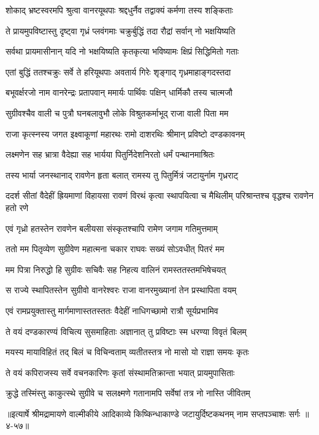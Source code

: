 
\twolineshloka
{शोकाद् भ्रष्टस्वरमपि श्रुत्वा वानरयूथपाः}
{श्रद्दधुर्नैव तद्वाक्यं कर्मणा तस्य शङ्किताः} %

\twolineshloka
{ते प्रायमुपविष्टास्तु दृष्ट्वा गृध्रं प्लवंगमाः}
{चक्रुर्बुद्धिं तदा रौद्रां सर्वान् नो भक्षयिष्यति} %

\twolineshloka
{सर्वथा प्रायमासीनान् यदि नो भक्षयिष्यति}
{कृतकृत्या भविष्यामः क्षिप्रं सिद्धिमितो गताः} %

\twolineshloka
{एतां बुद्धिं ततश्चक्रुः सर्वे ते हरियूथपाः}
{अवतार्य गिरेः शृङ्गाद् गृध्रमाहाङ्गदस्तदा} %

\twolineshloka
{बभूवर्क्षरजो नाम वानरेन्द्रः प्रतापवान्}
{ममार्यः पार्थिवः पक्षिन् धार्मिकौ तस्य चात्मजौ} %

\twolineshloka
{सुग्रीवश्चैव वाली च पुत्रौ घनबलावुभौ}
{लोके विश्रुतकर्माभूद् राजा वाली पिता मम} %

\twolineshloka
{राजा कृत्स्नस्य जगत इक्ष्वाकूणां महारथः}
{रामो दाशरथिः श्रीमान् प्रविष्टो दण्डकावनम्} %

\twolineshloka
{लक्ष्मणेन सह भ्रात्रा वैदेह्या सह भार्यया}
{पितुर्निदेशनिरतो धर्मं पन्थानमाश्रितः} %

\twolineshloka
{तस्य भार्या जनस्थानाद् रावणेन हृता बलात्}
{रामस्य तु पितुर्मित्रं जटायुर्नाम गृध्रराट्} %

\threelineshloka
{ददर्श सीतां वैदेहीं ह्रियमाणां विहायसा}
{रावणं विरथं कृत्वा स्थापयित्वा च मैथिलीम्}
{परिश्रान्तश्च वृद्धश्च रावणेन हतो रणे} %

\twolineshloka
{एवं गृध्रो हतस्तेन रावणेन बलीयसा}
{संस्कृतश्चापि रामेण जगाम गतिमुत्तमाम्} %

\twolineshloka
{ततो मम पितृव्येण सुग्रीवेण महात्मना}
{चकार राघवः सख्यं सोऽवधीत् पितरं मम} %

\twolineshloka
{मम पित्रा निरुद्धो हि सुग्रीवः सचिवैः सह}
{निहत्य वालिनं रामस्ततस्तमभिषेचयत्} %

\twolineshloka
{स राज्ये स्थापितस्तेन सुग्रीवो वानरेश्वरः}
{राजा वानरमुख्यानां तेन प्रस्थापिता वयम्} %

\twolineshloka
{एवं रामप्रयुक्तास्तु मार्गमाणास्ततस्ततः}
{वैदेहीं नाधिगच्छामो रात्रौ सूर्यप्रभामिव} %

\twolineshloka
{ते वयं दण्डकारण्यं विचित्य सुसमाहिताः}
{अज्ञानात् तु प्रविष्टाः स्म धरण्या विवृतं बिलम्} %

\twolineshloka
{मयस्य मायाविहितं तद् बिलं च विचिन्वताम्}
{व्यतीतस्तत्र नो मासो यो राज्ञा समयः कृतः} %

\twolineshloka
{ते वयं कपिराजस्य सर्वे वचनकारिणः}
{कृतां संस्थामतिक्रान्ता भयात् प्रायमुपासिताः} %

\twolineshloka
{क्रुद्धे तस्मिंस्तु काकुत्स्थे सुग्रीवे च सलक्ष्मणे}
{गतानामपि सर्वेषां तत्र नो नास्ति जीवितम्} %


॥इत्यार्षे श्रीमद्रामायणे वाल्मीकीये आदिकाव्ये किष्किन्धाकाण्डे जटायुर्दिष्टकथनम् नाम सप्तपञ्चाशः सर्गः ॥४-५७॥
